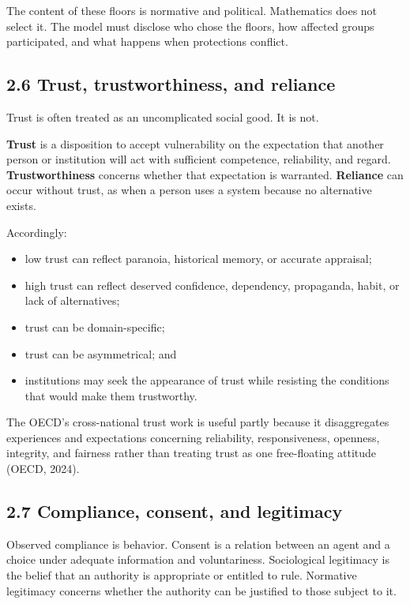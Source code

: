 \documentclass[
  11pt,
]{article}
\providecommand{\tightlist}{%
  \setlength{\itemsep}{0pt}\setlength{\parskip}{0pt}}
\begin{document}
The content of these floors is normative and political. Mathematics does
not select it. The model must disclose who chose the floors, how
affected groups participated, and what happens when protections
conflict.

\subsection{2.6 Trust, trustworthiness, and
reliance}\label{trust-trustworthiness-and-reliance}

Trust is often treated as an uncomplicated social good. It is not.

\textbf{Trust} is a disposition to accept vulnerability on the
expectation that another person or institution will act with sufficient
competence, reliability, and regard. \textbf{Trustworthiness} concerns
whether that expectation is warranted. \textbf{Reliance} can occur
without trust, as when a person uses a system because no alternative
exists.

Accordingly:

\begin{itemize}
\tightlist
\item
  low trust can reflect paranoia, historical memory, or accurate
  appraisal;
\item
  high trust can reflect deserved confidence, dependency, propaganda,
  habit, or lack of alternatives;
\item
  trust can be domain-specific;
\item
  trust can be asymmetrical; and
\item
  institutions may seek the appearance of trust while resisting the
  conditions that would make them trustworthy.
\end{itemize}

The OECD's cross-national trust work is useful partly because it
disaggregates experiences and expectations concerning reliability,
responsiveness, openness, integrity, and fairness rather than treating
trust as one free-floating attitude (OECD, 2024).

\subsection{2.7 Compliance, consent, and
legitimacy}\label{compliance-consent-and-legitimacy}

Observed compliance is behavior. Consent is a relation between an agent
and a choice under adequate information and voluntariness. Sociological
legitimacy is the belief that an authority is appropriate or entitled to
rule. Normative legitimacy concerns whether the authority can be
justified to those subject to it.
\end{document}
